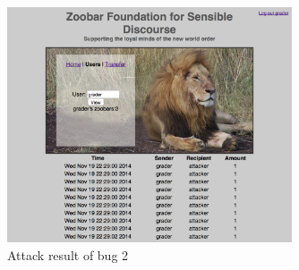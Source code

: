 \documentclass{llncs}
\begin{document}
\begin{figure}
  \begin{center}
    \includegraphics[width=0.75\textwidth]{bug2.png}
  \end{center}
  \caption{Attack result of bug 2}
  \label{fig:bug2}
\end{figure}
\end{document}
